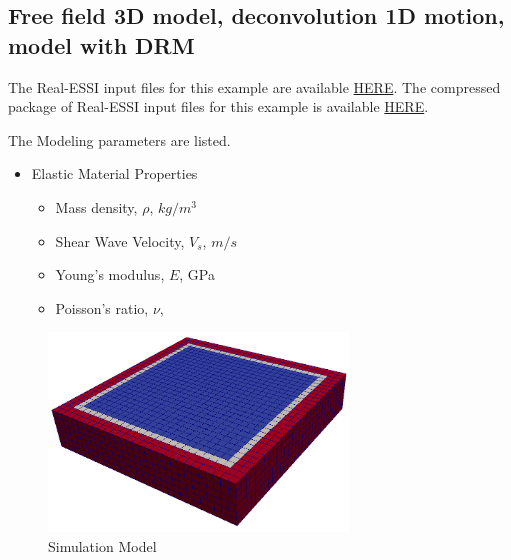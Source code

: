 \subsection{Free field 3D model, deconvolution 1D motion, model with DRM}
\label{Free_fields_3D_model_with_DRM1}


The Real-ESSI input files for this example are available 
\href{http://sokocalo.engr.ucdavis.edu/~jeremic/lecture_notes_online_material/_Chapter_Short_Course_Examples/short-course-examples/Day2/Deconvolution_1D_Motions/Free_fields_3D_model_with_DRM}{HERE}. 
The compressed package of Real-ESSI input files for this example is available 
\href{http://sokocalo.engr.ucdavis.edu/~jeremic/lecture_notes_online_material/_Chapter_Short_Course_Examples/short-course-examples/Day2/Deconvolution_1D_Motions/Free_fields_3D_model_with_DRM/_all_files_packaged_for_Free_fields_3D_model_with_DRM.tar.gz}{HERE}. 

The Modeling parameters are listed.
\begin{itemize}
  \item Elastic Material Properties 
  \begin{itemize}
    \item Mass density, $\rho$, \enspace {} $kg/m^3$
    \item Shear Wave Velocity, $V_s$, \enspace {} $m/s$
    \item Young's modulus, $E$, \enspace {} GPa
    \item Poisson's ratio, $\nu$, \enspace {}
  \end{itemize}
\end{itemize}


\begin{figure}[H]
  \centering
  \includegraphics[width = 8cm]{./Figure-files/Day2/Deconvolution_1D_Motions/Free_fields_3D_model_with_DRM/overview.png}
  \caption{Simulation Model}
  \label{fig_decon_1D_motion_3D_model1}
\end{figure}


